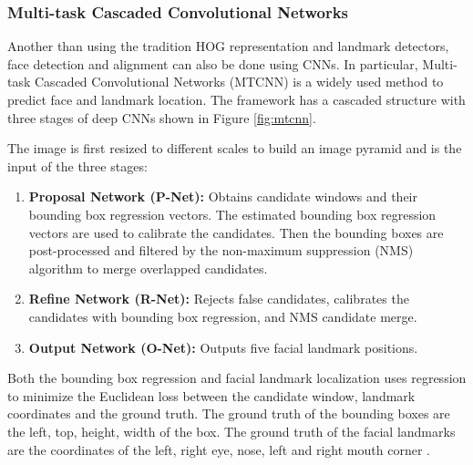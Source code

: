 \documentclass[12pt,english]{article}
\begin{document}
\subsubsection{Multi-task Cascaded Convolutional Networks}

Another than using the tradition HOG representation and landmark detectors, face detection and alignment can also be done using CNNs. In particular, Multi-task Cascaded Convolutional Networks (MTCNN) is a widely used method to predict face and landmark location. The framework has a cascaded structure with three stages of deep CNNs shown in Figure \ref{fig:mtcnn}. \cite{zhang} 

The image is first resized to different scales to build an image pyramid and is the input of the three stages:

\begin{enumerate}
\item \textbf{Proposal Network (P-Net):} Obtains candidate windows and their bounding box regression vectors. The estimated bounding box regression vectors are used to calibrate the candidates. Then the bounding boxes are post-processed and filtered by the non-maximum suppression (NMS) algorithm to merge overlapped candidates.

\item \textbf{Refine Network (R-Net):} Rejects false candidates, calibrates the candidates with bounding box regression, and NMS candidate merge.

\item \textbf{Output Network (O-Net):} Outputs five facial landmark positions.

\end{enumerate}

Both the bounding box regression and facial landmark localization uses regression to minimize the Euclidean loss between the candidate window, landmark coordinates and the ground truth. The ground truth of the bounding boxes are the left, top, height, width of the box. The ground truth of the facial landmarks are the coordinates of the left, right eye, nose, left and right mouth corner \cite{zhang}.
\end{document}
